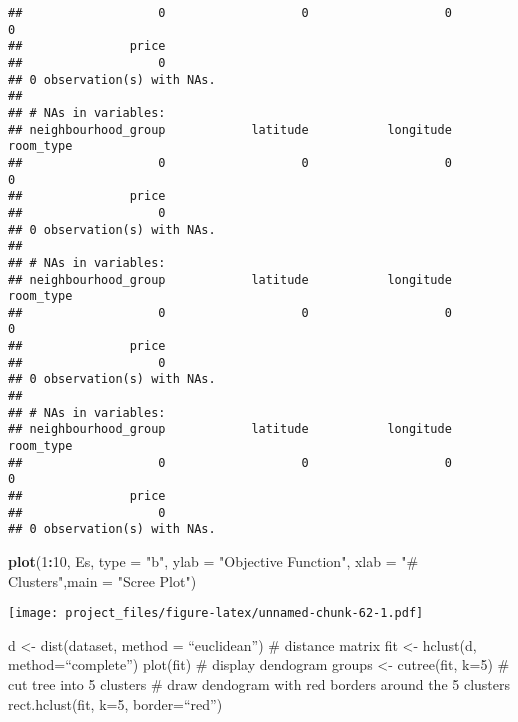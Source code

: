 \documentclass[
]{article}
\newenvironment{Shaded}{\begin{snugshade}}{\end{snugshade}}
\newcommand{\CommentTok}[1]{\textcolor[rgb]{0.56,0.35,0.01}{\textit{#1}}}
\newcommand{\DataTypeTok}[1]{\textcolor[rgb]{0.13,0.29,0.53}{#1}}
\newcommand{\DecValTok}[1]{\textcolor[rgb]{0.00,0.00,0.81}{#1}}
\newcommand{\KeywordTok}[1]{\textcolor[rgb]{0.13,0.29,0.53}{\textbf{#1}}}
\newcommand{\NormalTok}[1]{#1}
\newcommand{\OperatorTok}[1]{\textcolor[rgb]{0.81,0.36,0.00}{\textbf{#1}}}
\newcommand{\OtherTok}[1]{\textcolor[rgb]{0.56,0.35,0.01}{#1}}
\newcommand{\StringTok}[1]{\textcolor[rgb]{0.31,0.60,0.02}{#1}}
\begin{document}
\begin{verbatim}
##                   0                   0                   0                   0 
##               price 
##                   0 
## 0 observation(s) with NAs.
## 
## # NAs in variables:
## neighbourhood_group            latitude           longitude           room_type 
##                   0                   0                   0                   0 
##               price 
##                   0 
## 0 observation(s) with NAs.
## 
## # NAs in variables:
## neighbourhood_group            latitude           longitude           room_type 
##                   0                   0                   0                   0 
##               price 
##                   0 
## 0 observation(s) with NAs.
## 
## # NAs in variables:
## neighbourhood_group            latitude           longitude           room_type 
##                   0                   0                   0                   0 
##               price 
##                   0 
## 0 observation(s) with NAs.
\end{verbatim}

\begin{Shaded}
\begin{Highlighting}[]
\KeywordTok{plot}\NormalTok{(}\DecValTok{1}\OperatorTok{:}\DecValTok{10}\NormalTok{, Es, }\DataTypeTok{type =} \StringTok{"b"}\NormalTok{, }\DataTypeTok{ylab =} \StringTok{"Objective Function"}\NormalTok{, }\DataTypeTok{xlab =} \StringTok{"# Clusters"}\NormalTok{,}\DataTypeTok{main =} \StringTok{"Scree Plot"}\NormalTok{) }
\end{Highlighting}
\end{Shaded}

\texttt{[image: project\_files/figure-latex/unnamed-chunk-62-1.pdf]}

d \textless- dist(dataset, method = ``euclidean'') \# distance matrix
fit \textless- hclust(d, method=``complete'') plot(fit) \# display
dendogram groups \textless- cutree(fit, k=5) \# cut tree into 5 clusters
\# draw dendogram with red borders around the 5 clusters
rect.hclust(fit, k=5, border=``red'')

\begin{Shaded}
\end{Shaded}
\end{document}
